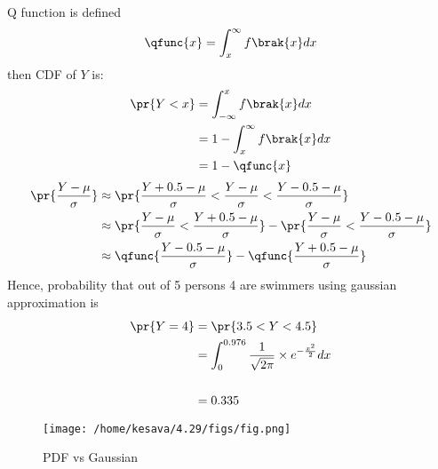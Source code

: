 \documentclass[journal,12pt,onecolumn]{IEEEtran}
\theoremstyle{remark}
\begin{document}
Q function is defined
\begin{align}
	\qfunc{x}=\int_x^{\infty}f\brak{x}dx
\end{align}
then CDF of $Y$ is:
\begin{align}
	\pr{Y<x}&=\int_{-\infty}^x f\brak{x} dx\\
	&=1-\int_x^{\infty}f\brak{x}dx\\
	&=1-\qfunc{x}
\end{align}
\begin{align}
	\pr{\frac{Y-\mu}{\sigma}} &\approx \pr{\frac{Y+0.5-\mu}{\sigma} < \frac{Y-\mu}{\sigma} < \frac{Y-0.5-\mu}{\sigma}}\\
	&\approx \pr{\frac{Y-\mu}{\sigma}<\frac{Y+0.5-\mu}{\sigma}} - \pr{\frac{Y-\mu}{\sigma}<\frac{Y-0.5-\mu}{\sigma}}\\
	&\approx \qfunc{\frac{Y-0.5-\mu}{\sigma}} - \qfunc{\frac{Y+0.5-\mu}{\sigma}}
\end{align}
Hence, probability that out of 5 persons 4 are swimmers using gaussian approximation is
\begin{align}
\pr{Y = 4} &= \pr{3.5 < Y < 4.5}\\
 &= \int_{0}^{0.976}\frac{1}{\sqrt{2\pi}}\times e^{-\frac{x^2}{2}}dx\\\\
	&= 0.335
\end{align} 

\begin{figure}[!ht]
\texttt{[image: /home/kesava/4.29/figs/fig.png]}
\caption{ PDF vs Gaussian}
\label{fig:gaussian/9/3/29/1/}
\end{figure}
\end{document}
